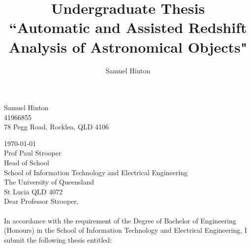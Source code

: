 \documentclass[titlesmallcaps, examinerscopy, copyrightpage]{uqthesis}
\begin{document}

\hypersetup{pageanchor=true}

\title{Undergraduate Thesis\\ \vspace{0.5 cm} ``Automatic and Assisted Redshift Analysis of Astronomical Objects" }
\author{Samuel Hinton}

\renewcommand{\degreetext}{in partial fulfilment of the Degree Bachelor of Engineering\\ in the
discipline of Software Engineering}

\frontmatter

\titlepage




\begin{flushright}
Samuel Hinton\\ 41966855\\ 78 Pegg Road, Rocklea, QLD 4106\\
\end{flushright}

\noindent \today \\

\noindent Prof Paul Strooper\\
Head of School\\
School of Information Technology and Electrical Engineering\\
The University of  Queensland\\
St Lucia QLD 4072\\

\noindent Dear Professor Strooper,\\ \\
In accordance with the requirement of the Degree of Bachelor of Engineering (Honours) in the School
of Information Technology and Electrical Engineering, I submit the following thesis entitled:
\end{document}
